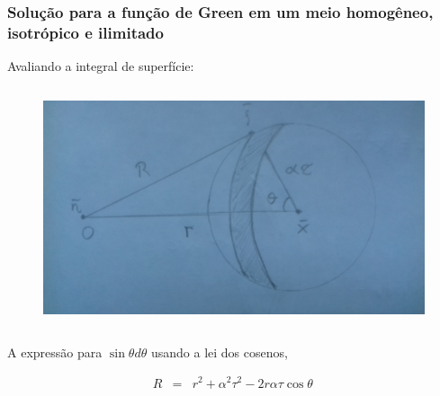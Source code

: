 \documentclass{beamer}
\begin{document}
\begin{frame}
	\frametitle{\textbf{Solu\c{c}\~ao para a fun\c{c}\~ao de Green em um meio homog\^eneo, isotr\'opico e ilimitado}}
	\begin{flushleft}
		\textcolor{red!60!black}{Avaliando a integral de superf\'icie:}
	\end{flushleft}
	
	\begin{columns}        
		\begin{column}{0.60\textwidth}  
			\begin{figure}[h!]   
				\includegraphics[scale=0.058]{Fig5.jpg}       
			\end{figure}
		\end{column}
	\end{columns}
	
	\begin{flushleft}
		A express\~ao para $\sin \theta d\theta$ usando a lei dos cosenos,
	\end{flushleft}
	\begin{eqnarray}
	\label{ten1}
	R &=&  r^2 + \alpha^2 \tau^2  - 2r\alpha\tau \cos \theta\,
	\end{eqnarray}
	
\end{frame}%
\end{document}
